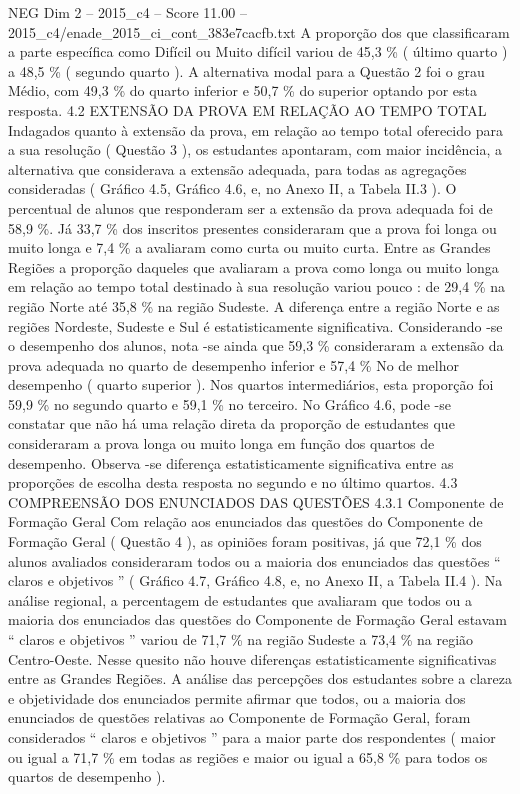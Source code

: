 \begin{textsample}{NEG Dim 2 – 2015\_c4 – Score 11.00 – 2015\_c4/enade\_2015\_ci\_cont\_383e7cacfb.txt}
A proporção dos que classificaram a parte específica como Difícil ou Muito difícil variou de 45,3 \% ( último quarto ) a 48,5 \% ( segundo quarto ).
A alternativa modal para a Questão 2 foi o grau Médio, com 49,3 \% do quarto inferior e 50,7 \% do superior optando por esta resposta. 4.2 EXTENSÃO DA PROVA EM RELAÇÃO AO TEMPO TOTAL Indagados quanto à extensão da prova, em relação ao tempo total oferecido para a sua resolução ( Questão 3 ), os estudantes apontaram, com maior incidência, a alternativa que considerava a extensão adequada, para todas as agregações consideradas ( Gráfico 4.5, Gráfico 4.6, e, no Anexo II, a Tabela II.3 ).
O percentual de alunos que responderam ser a extensão da prova adequada foi de 58,9 \%.
Já 33,7 \% dos inscritos presentes consideraram que a prova foi longa ou muito longa e 7,4 \% a avaliaram como curta ou muito curta.
Entre as Grandes Regiões a proporção daqueles que avaliaram a prova como longa ou muito longa em relação ao tempo total destinado à sua resolução variou pouco : de 29,4 \% na região Norte até 35,8 \% na região Sudeste.
A diferença entre a região Norte e as regiões Nordeste, Sudeste e Sul é estatisticamente significativa.
Considerando -se o desempenho dos alunos, nota -se ainda que 59,3 \% consideraram a extensão da prova adequada no quarto de desempenho inferior e 57,4 \% No de melhor desempenho ( quarto superior ).
Nos quartos intermediários, esta proporção foi 59,9 \% no segundo quarto e 59,1 \% no terceiro.
No Gráfico 4.6, pode -se constatar que não há uma relação direta da proporção de estudantes que consideraram a prova longa ou muito longa em função dos quartos de desempenho.
Observa -se diferença estatisticamente significativa entre as proporções de escolha desta resposta no segundo e no último quartos. 4.3 COMPREENSÃO DOS ENUNCIADOS DAS QUESTÕES 4.3.1 Componente de Formação Geral Com relação aos enunciados das questões do Componente de Formação Geral ( Questão 4 ), as opiniões foram positivas, já que 72,1 \% dos alunos avaliados consideraram todos ou a maioria dos enunciados das questões “ claros e objetivos ” ( Gráfico 4.7, Gráfico 4.8, e, no Anexo II, a Tabela II.4 ).
Na análise regional, a percentagem de estudantes que avaliaram que todos ou a maioria dos enunciados das questões do Componente de Formação Geral estavam “ claros e objetivos ” variou de 71,7 \% na região Sudeste a 73,4 \% na região Centro-Oeste.
Nesse quesito não houve diferenças estatisticamente significativas entre as Grandes Regiões.
A análise das percepções dos estudantes sobre a clareza e objetividade dos enunciados permite afirmar que todos, ou a maioria dos enunciados de questões relativas ao Componente de Formação Geral, foram considerados “ claros e objetivos ” para a maior parte dos respondentes ( maior ou igual a 71,7 \% em todas as regiões e maior ou igual a 65,8 \% para todos os quartos de desempenho ).

\end{textsample}
